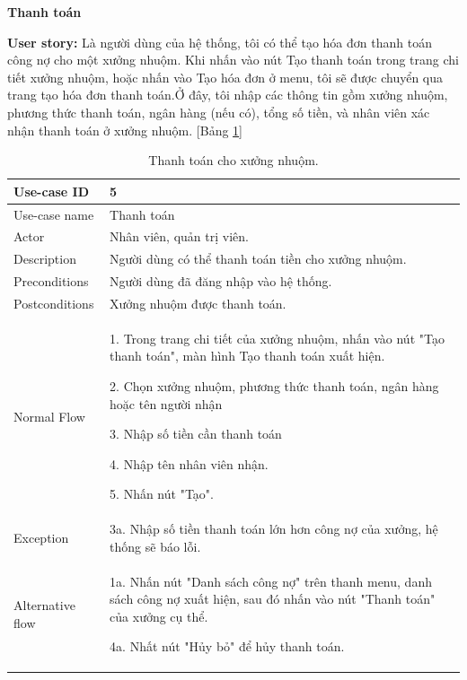 \textbf{Thanh toán}\par
\textbf{User story:} Là người dùng của hệ thống, tôi có thể tạo hóa đơn thanh toán công nợ cho một xưởng nhuộm. Khi nhấn vào nút Tạo thanh toán trong trang chi tiết xưởng nhuộm, hoặc nhấn vào Tạo hóa đơn ở menu, tôi sẽ được chuyển qua trang tạo hóa đơn thanh toán.Ở đây, tôi nhập các thông tin gồm xưởng nhuộm, phương thức thanh toán, ngân hàng (nếu có), tổng số tiền, và nhân viên xác nhận thanh toán ở xưởng nhuộm. [Bảng \ref{bang5}]
\begin{table}[H]
    \centering
    \begin{tabular}{|m{3cm}|m{10cm}|}
    \hline 
        Use-case ID & 5\\ \hline
        Use-case name & Thanh toán\\ \hline
        Actor & Nhân viên, quản trị viên.\\ \hline
        Description & Người dùng có thể thanh toán tiền cho xưởng nhuộm.\\ \hline
        Preconditions & Người dùng đã đăng nhập vào hệ thống.\\ \hline
        Postconditions & Xưởng nhuộm được thanh toán.\\ \hline
        Normal Flow & 
        1. Trong trang chi tiết của xưởng nhuộm, nhấn vào nút "Tạo thanh toán", màn hình Tạo thanh toán xuất hiện.\par
        2. Chọn xưởng nhuộm, phương thức thanh toán, ngân hàng hoặc tên người nhận\par
        3. Nhập số tiền cần thanh toán\par
        4. Nhập tên nhân viên nhận.\par
        5. Nhấn nút "Tạo".
        \\ \hline
        Exception & 
        3a. Nhập số tiền thanh toán lớn hơn công nợ của xưởng, hệ thống sẽ báo lỗi.
        \\ \hline
        Alternative flow & 
        1a. Nhấn nút "Danh sách công nợ" trên thanh menu, danh sách công nợ xuất hiện, sau đó nhấn vào nút "Thanh toán" của xưởng cụ thể.\par
        4a. Nhất nút "Hủy bỏ" để hủy thanh toán.
        \\ 
    \hline 
    \end{tabular}
    \caption{Thanh toán cho xưởng nhuộm.}
    \label{bang5}
\end{table}


